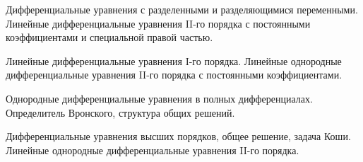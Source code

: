 \documentclass[
	14pt,
	a4paper,
	]
	{scrartcl}
\begin{document}
\vfill

\newpage


\shapk
{}
\setcounter{zad}{0}

\vfill
\z Дифференциальные уравнения с разделенными и разделяющимися переменными.
 \vfill
\z Линейные дифференциальные уравнения II-го порядка с постоянными коэффициентами и специальной правой частью.
 \vfill

\vfill

\newpage


\shapk
{}
\setcounter{zad}{0}

\vfill
\z Линейные дифференциальные уравнения I-го порядка.
 \vfill
\z Линейные однородные дифференциальные уравнения II-го порядка с постоянными коэффициентами.
 \vfill

\vfill

\newpage


\shapk
{}
\setcounter{zad}{0}

\vfill
\z Однородные дифференциальные уравнения в полных дифференциалах.
 \vfill
\z Определитель Вронского, структура общих решений.
 \vfill

\vfill

\newpage


\shapk
{}
\setcounter{zad}{0}

\vfill
\z Дифференциальные уравнения высших порядков, общее решение, задача Коши.
 \vfill
\z Линейные однородные дифференциальные уравнения II-го порядка.
 \vfill

\vfill

\newpage
\end{document}
